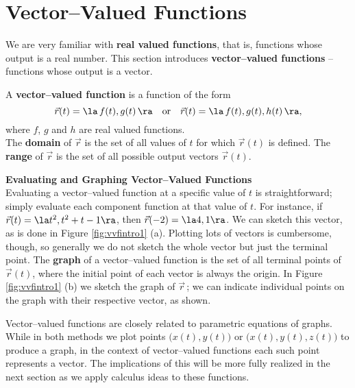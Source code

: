\section{Vector--Valued Functions}\label{sec:vvf}

We are very familiar with \textbf{real valued functions}, that is, functions whose output is a real number. This section introduces \textbf{vector--valued functions} -- functions whose output is a vector. 

{A \textbf{vector--valued function} is a function of the form 
$$\vec r(t) = \la\, f(t),g(t)\,\ra \quad \text{or}\quad \vec r(t) = \la \,f(t),g(t),h(t)\,\ra,$$
where $f$, $g$ and $h$ are real valued functions.\\

The \textbf{domain} of $\vec r$ is the set of all values of $t$ for which $\vec r(t)$ is defined. The \textbf{range} of $\vec r$ is the set of all possible output vectors $\vec r(t)$.
}

\noindent\textbf{Evaluating and Graphing Vector--Valued Functions}\\

Evaluating a vector--valued function at a specific value of $t$ is straightforward; simply evaluate each component function at that value of $t$. For instance, if $\vec r(t) = \la t^2,t^2+t-1\ra$, then $\vec r(-2) = \la 4,1\ra$. We can sketch this vector, as is done in Figure \ref{fig:vvfintro1} (a). Plotting lots of vectors is cumbersome, though, so generally we do not sketch the whole vector but just the terminal point. The \textbf{graph} of a vector--valued function is the set of all terminal points of $\vec r(t)$, where the initial point of each vector is always the origin. In Figure \ref{fig:vvfintro1} (b) we sketch the graph of $\vec r$\,; we can indicate individual points on the graph with their respective vector, as shown.

Vector--valued functions are closely related to parametric equations of graphs. While in both methods we plot points $\big(x(t), y(t)\big)$ or $\big(x(t),y(t),z(t)\big)$ to produce a graph, in the context of vector--valued functions each such point represents a vector. The implications of this will be more fully realized in the next section as we apply calculus ideas to these functions.\\

